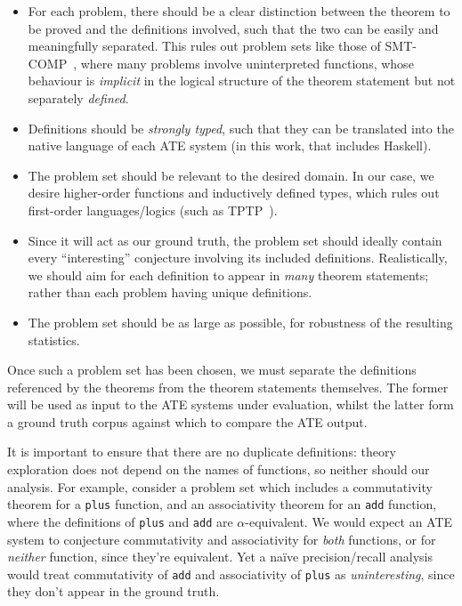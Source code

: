 \begin{itemize}
\item For each problem, there should be a clear distinction between the theorem
  to be proved and the definitions involved, such that the two can be easily and
  meaningfully separated. This rules out problem sets like those of
  SMT-COMP~\cite{barrett2005smt}, where many problems involve uninterpreted
  functions, whose behaviour is \emph{implicit} in the logical structure of the
  theorem statement but not separately \emph{defined}.
\item Definitions should be \emph{strongly typed}, such that they can be
  translated into the native language of each ATE system (in this work, that
  includes Haskell\iffalse FIXME and Isabelle\fi).
\item The problem set should be relevant to the desired domain. In our case, we
  desire higher-order functions and inductively defined types, which rules out
  first-order languages/logics (such as TPTP~\cite{sutcliffe2009tptp}).
\item Since it will act as our ground truth, the problem set should ideally
  contain every ``interesting'' conjecture involving its included
  definitions. Realistically, we should aim for each definition to appear in
  \emph{many} theorem statements; rather than each problem having unique
  definitions.
\item The problem set should be as large as possible, for robustness of the
  resulting statistics.
\end{itemize}

Once such a problem set has been chosen, we must separate the definitions
referenced by the theorems from the theorem statements themselves. The former
will be used as input to the ATE systems under evaluation, whilst the latter
form a ground truth corpus against which to compare the ATE output.

It is important to ensure that there are no duplicate definitions: theory
exploration does not depend on the names of functions, so neither should our
analysis. For example, consider a problem set which includes a commutativity
theorem for a \texttt{plus} function, and an associativity theorem for an
\texttt{add} function, where the definitions of \texttt{plus} and \texttt{add}
are $\alpha$-equivalent. We would expect an ATE system to conjecture
commutativity and associativity for \emph{both} functions, or for \emph{neither}
function, since they're equivalent. Yet a na\"ive precision/recall analysis
would treat commutativity of \texttt{add} and associativity of \texttt{plus} as
\emph{uninteresting}, since they don't appear in the ground truth.

